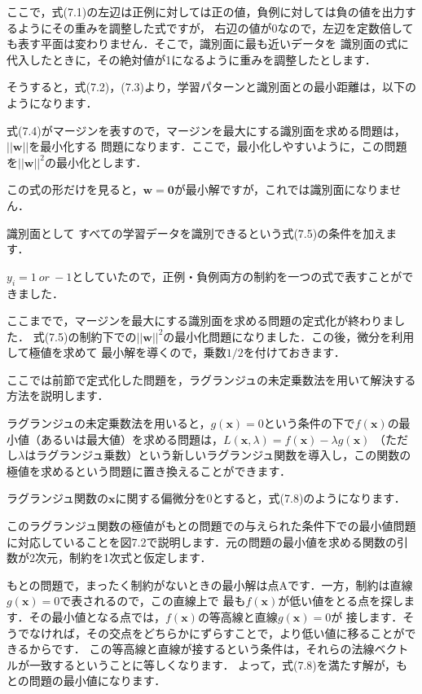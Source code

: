 ここで，式(7.1)の左辺は正例に対しては正の値，負例に対しては負の値を出力するようにその重みを調整した式ですが，
右辺の値が0なので，左辺を定数倍しても表す平面は変わりません．そこで，識別面に最も近いデータを
識別面の式に代入したときに，その絶対値が1になるように重みを調整したとします．

そうすると，式(7.2)，(7.3)より，学習パターンと識別面との最小距離は，以下のようになります．

式(7.4)がマージンを表すので，マージンを最大にする識別面を求める問題は，$||\bm{w}||$を最小化する
問題になります．ここで，最小化しやすいように，この問題を$||\bm{w}||^2$の最小化とします．

この式の形だけを見ると，$\bm{w}=\bm{0}$が最小解ですが，これでは識別面になりません．


識別面として
すべての学習データを識別できるという式(7.5)の条件を加えます．

$y_i=1~or~-1$としていたので，正例・負例両方の制約を一つの式で表すことができました．

ここまでで，マージンを最大にする識別面を求める問題の定式化が終わりました．
式(7.5)の制約下での$||\bm{w} ||^2$の最小化問題になりました．この後，微分を利用して極値を求めて
最小解を導くので，乗数$1/2$を付けておきます．


ここでは前節で定式化した問題を，ラグランジュの未定乗数法を用いて解決する方法を説明します．

ラグランジュの未定乗数法を用いると，$g(\bm{x})=0$という条件の下で$f(\bm{x})$の最小値（あるいは最大値）を求める問題は，$L(\bm{x}, \lambda)=f(\bm{x})-\lambda g(\bm{x})$ （ただし$\lambda$はラグランジュ乗数）という新しいラグランジュ関数を導入し，この関数の極値を求めるという問題に置き換えることができます．

ラグランジュ関数の$\bm{x}$に関する偏微分を0とすると，式(7.8)のようになります．


このラグランジュ関数の極値がもとの問題での与えられた条件下での最小値問題に対応していることを図7.2で説明します．元の問題の最小値を求める関数の引数が2次元，制約を1次式と仮定します．

もとの問題で，まったく制約がないときの最小解は点Aです．一方，制約は直線$g(\bm{x})=0$で表されるので，この直線上で
最も$f(\bm{x})$が低い値をとる点を探します．その最小値となる点では，$f(\bm{x})$の等高線と直線$g(\bm{x})=0$が
接します．そうでなければ，その交点をどちらかにずらすことで，より低い値に移ることができるからです．
この等高線と直線が接するという条件は，それらの法線ベクトルが一致するということに等しくなります．
よって，式(7.8)を満たす解が，もとの問題の最小値になります．

